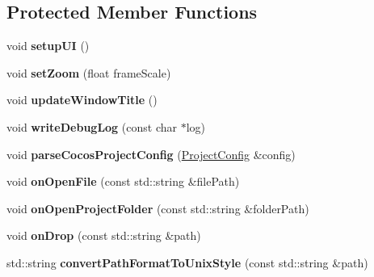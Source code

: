 \subsection*{Protected Member Functions}
\begin{DoxyCompactItemize}
\item 
\mbox{\label{classSimulatorWin_a4b82fff88984ba4c4727f5e7421a22bf}} 
void {\bfseries setup\+UI} ()
\item 
\mbox{\label{classSimulatorWin_ae49626e326e01ab0b9e6ed8611cb64e6}} 
void {\bfseries set\+Zoom} (float frame\+Scale)
\item 
\mbox{\label{classSimulatorWin_a7f8669c4d57d6ecc96c9124989199c1e}} 
void {\bfseries update\+Window\+Title} ()
\item 
\mbox{\label{classSimulatorWin_a9478a4cd59aa4d289be9d8cb1f0afed6}} 
void {\bfseries write\+Debug\+Log} (const char $\ast$log)
\item 
\mbox{\label{classSimulatorWin_af09e6dee29ac84dc83df86dbb12277b7}} 
void {\bfseries parse\+Cocos\+Project\+Config} (\hyperlink{classProjectConfig}{Project\+Config} \&config)
\item 
\mbox{\label{classSimulatorWin_a4ab5c2ade926a3219b658521f8570bbd}} 
void {\bfseries on\+Open\+File} (const std\+::string \&file\+Path)
\item 
\mbox{\label{classSimulatorWin_ad11ff25ca66679a4267a02b26c3f50bd}} 
void {\bfseries on\+Open\+Project\+Folder} (const std\+::string \&folder\+Path)
\item 
\mbox{\label{classSimulatorWin_a2ea0f6f99a0427ebe6d8d53db970c44d}} 
void {\bfseries on\+Drop} (const std\+::string \&path)
\item 
\mbox{\label{classSimulatorWin_ae9060f7d65b28f049d9715fa439ff02b}} 
std\+::string {\bfseries convert\+Path\+Format\+To\+Unix\+Style} (const std\+::string \&path)
\item 
\mbox{\label{classSimulatorWin_a5172f474956da2f0a2bde34516ca1982}} 

\end{DoxyCompactItemize}

